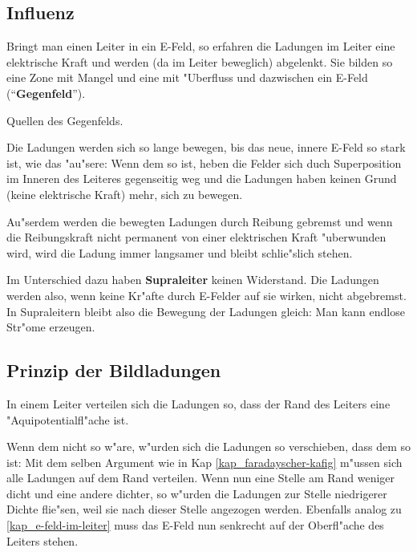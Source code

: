 \subsection{Influenz}
\label{kap_influenz}

Bringt man einen Leiter in ein E-Feld, so erfahren die Ladungen im
Leiter eine elektrische Kraft und werden (da im Leiter beweglich)
abgelenkt. Sie bilden so eine Zone mit Mangel und eine mit "Uberfluss
und dazwischen ein E-Feld
("`\textbf{Gegenfeld}"').

\begin{Def}
  Quellen des Gegenfelds.
\end{Def}

Die Ladungen werden sich so
lange bewegen, bis das neue, innere E-Feld so stark ist, wie das
"au"sere: Wenn dem so ist, heben die Felder sich duch Superposition im
Inneren des Leiteres gegenseitig weg und die Ladungen haben keinen
Grund (keine elektrische Kraft) mehr, sich zu bewegen.

Au"serdem werden die bewegten Ladungen durch Reibung gebremst und wenn
die Reibungskraft nicht permanent von einer elektrischen Kraft
"uberwunden wird, wird die Ladung immer langsamer und bleibt
schlie"slich stehen.

Im Unterschied dazu haben \textbf{Supraleiter}
keinen Widerstand. Die Ladungen werden also, wenn keine Kr"afte durch
E-Felder auf sie wirken, nicht abgebremst. In Supraleitern bleibt also
die Bewegung der Ladungen gleich: Man kann endlose Str"ome erzeugen.




\subsection{Prinzip der Bildladungen}
\label{kap_prinzip-bildladungen}

\begin{Wichtig}
   In einem Leiter verteilen sich die Ladungen so, dass der Rand des
   Leiters eine "Aquipotentialfl"ache ist.
\end{Wichtig}
Wenn dem nicht so w"are, w"urden sich die Ladungen so verschieben, dass
dem so ist: Mit dem selben Argument wie in Kap
\ref{kap_faradayscher-kafig} m"ussen sich alle Ladungen auf dem Rand
verteilen. Wenn nun eine Stelle am Rand weniger dicht und eine andere
dichter, so w"urden die Ladungen zur Stelle niedrigerer Dichte flie"sen,
weil sie nach dieser Stelle angezogen werden. Ebenfalls analog zu
\ref{kap_e-feld-im-leiter} muss das E-Feld nun senkrecht auf der
Oberfl"ache des Leiters stehen.

